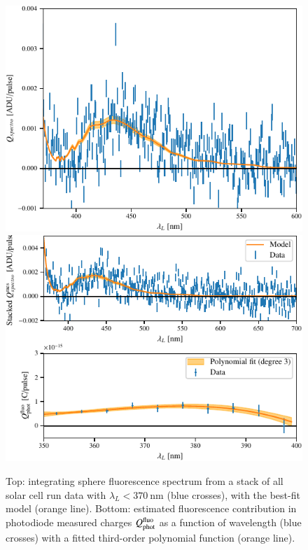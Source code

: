 \begin{figure}%
    \centering
    \includegraphics[width=\columnwidth]{fig/spectro_stack_fluo_model.pdf}
    \includegraphics[width=\columnwidth]{fig/QPDfluo_model.pdf}
    \caption{Top: integrating sphere fluorescence spectrum from a stack of all solar cell run data with $\lambda_L < \SI{370}{\nano\meter}$ (blue crosses), with the best-fit model (orange line). Bottom: estimated fluorescence contribution in photodiode measured charges $Q_{\mathrm{phot}}^{\rm fluo}$ as a function of wavelength (blue crosses) with a fitted third-order polynomial function (orange line).}
    \label{fig:fluo}
\end{figure}

